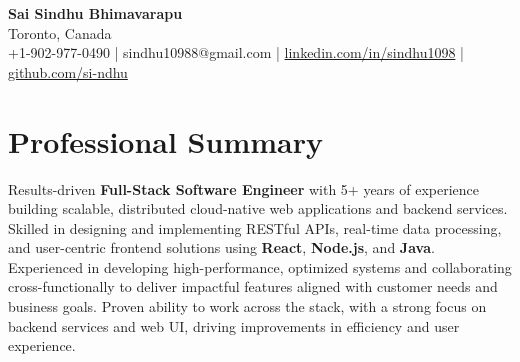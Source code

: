 \documentclass[letterpaper,11pt]{article}
\begin{document}
\begin{center}
  {\Large \textbf{Sai Sindhu Bhimavarapu}} \\
  Toronto, Canada \\
  +1-902-977-0490 \enspace | \enspace sindhu10988@gmail.com \enspace | \enspace \href{https://www.linkedin.com/in/sindhu1098/}{linkedin.com/in/sindhu1098} \enspace | \enspace \href{https://github.com/si-ndhu}{github.com/si-ndhu}
\end{center}

\section{Professional Summary}
  \begin{itemize}[leftmargin=0.15in, label={}]
    \small{\item{
     Results-driven \textbf{Full-Stack Software Engineer} with 5+ years of experience building scalable, distributed cloud-native web applications and backend services. Skilled in designing and implementing RESTful APIs, real-time data processing, and user-centric frontend solutions using \textbf{React}, \textbf{Node.js}, and \textbf{Java}. Experienced in developing high-performance, optimized systems and collaborating cross-functionally to deliver impactful features aligned with customer needs and business goals. Proven ability to work across the stack, with a strong focus on backend services and web UI, driving improvements in efficiency and user experience.
    }}
  \end{itemize}
\vspace{-16pt}

\end{document}
